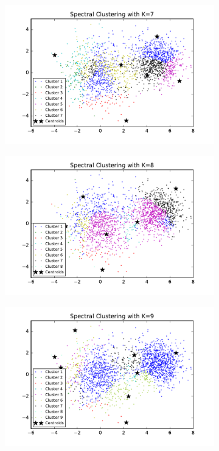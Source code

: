 \begin{figure}[htb]
\begin{subfigure}[b]{0.475\textwidth}
            \includegraphics[width=\textwidth]{./figures/clustering_spectral_7.pdf}
        \end{subfigure}
        \hfill
        \begin{subfigure}[b]{0.475\textwidth}  
            \centering 
            \includegraphics[width=\textwidth]{./figures/clustering_spectral_8.pdf}
        \end{subfigure}
        \begin{subfigure}[b]{0.475\textwidth}   
            \centering 
            \includegraphics[width=\textwidth]{./figures/clustering_spectral_9.pdf}

\end{subfigure}
\end{figure}
